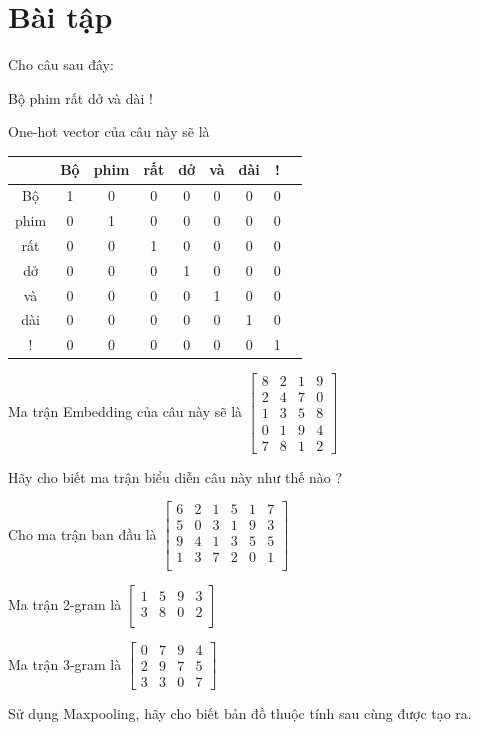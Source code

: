 \section{Bài tập}
\begin{exer}
Cho câu sau đây: 

Bộ phim rất dở và dài ! 

One-hot vector của câu này sẽ là 
\begin{table}[!h]
    \centering
    \begin{tabular}{ |c|c|c|c|c|c|c|c|c| } 
    \hline
         & Bộ & phim & rất & dở & và & dài & ! \\
    \hline
        Bộ & 1 & 0 & 0 & 0 & 0 & 0 & 0 \\
        phim & 0 & 1 & 0 & 0 & 0 & 0& 0 \\
        rất & 0 & 0 & 1 & 0 & 0 & 0 & 0 \\
        dở & 0 & 0 & 0 & 1 & 0 & 0 & 0 \\
        và & 0 & 0 & 0 & 0 & 1 & 0 & 0 \\
        dài & 0 & 0 & 0 & 0 & 0 & 1 & 0 \\
        ! & 0 & 0 & 0 & 0 & 0 & 0 & 1 \\
    \hline
    \end{tabular}
\end{table}

Ma trận Embedding của câu này sẽ là
$\begin{bmatrix}
    8 & 2 & 1 & 9 \\
    2 & 4 & 7 & 0 \\
    1 & 3 & 5 & 8 \\
    0 & 1 & 9 & 4 \\
    7 & 8 & 1 & 2
\end{bmatrix}$

Hãy cho biết ma trận biểu diễn câu này như thế nào ?
\end{exer}

\begin{exer}
Cho ma trận ban đầu là
$\begin{bmatrix}
    6 & 2 & 1 & 5 & 1 & 7 \\
    5 & 0 & 3 & 1 & 9 & 3 \\
    9 & 4 & 1 & 3 & 5 & 5 \\
    1 & 3 & 7 & 2 & 0 & 1 \\
\end{bmatrix}$

Ma trận 2-gram là
$\begin{bmatrix}
    1 & 5 & 9 & 3 \\
    3 & 8 & 0 & 2 \\
\end{bmatrix}$

Ma trận 3-gram là
$\begin{bmatrix}
    0 & 7 & 9 & 4 \\
    2 & 9 & 7 & 5 \\
    3 & 3 & 0 & 7
\end{bmatrix}$

Sử dụng Maxpooling, hãy cho biết bản đồ thuộc tính sau cùng được tạo ra.
\end{exer}

